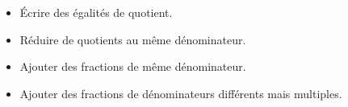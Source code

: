 \begin{prerequis}[Prérequis]    
    \begin{itemize}
        \item Écrire des égalités de quotient.
        \item Réduire de quotients au même dénominateur.
        \columnbreak
        \item Ajouter des fractions de même dénominateur.
        \item Ajouter des fractions de dénominateurs différents mais multiples. 
    \end{itemize}
\end{prerequis}
